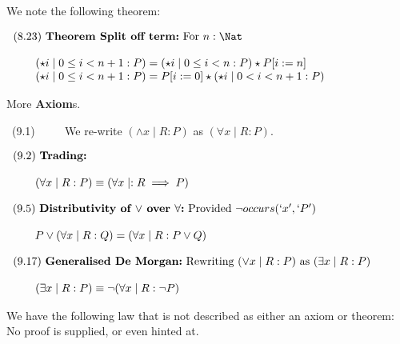 We note the following theorem:

$\begin{array}{l@{\quad}l}
   (8.23)~\textbf{Theorem Split off term:} \text{ For } n:\Nat
\\ \\ \qquad
   (\star i \mid 0 \leq i < n+1 : P)
   = (\star i \mid 0 \leq i < n : P) \star P[i:=n]
\\ \qquad
   (\star i \mid 0 \leq i < n+1 : P)
   = P[i:=0] \star (\star i \mid 0 < i < n+1 : P)
\end{array}$\newline\newline



More \textbf{Axiom}s.

~(9.1) $\qquad$ We re-write $(\land x \mid R : P)$ as $(\forall x \mid R : P)$.
\newline

$\begin{array}{l@{\quad}l}
   (9.2)~\textbf{Trading:} 
\\ \\ \qquad
   (\forall x \mid R : P) \equiv (\forall x\mid: R \implies P)
\end{array}$\newline\newline

$\begin{array}{l@{\quad}l}
   (9.5)~\textbf{Distributivity of $\lor$ over $\forall$:} 
   \text{ Provided }  \lnot occurs(`x',`P')
\\ \\ \qquad
   P \lor (\forall x \mid R : Q)
   = (\forall x \mid R: P \lor Q)
\end{array}$\newline\newline

$\begin{array}{l@{\quad}l}
   (9.17)~\textbf{Generalised De Morgan:} 
   \text{ Rewriting $(\lor x \mid R : P)$ as $(\exists x \mid R : P)$}
\\ \\ \qquad
   (\exists x \mid R : P) \equiv \lnot (\forall x \mid R : \lnot P)
\end{array}$\newline\newline

We have the following law that is not described as either an axiom or theorem:
No proof is supplied, or even hinted at.

